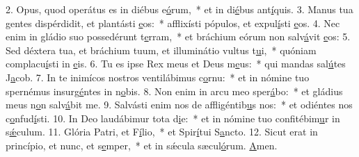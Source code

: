 2. Opus, quod operátus es in diébus e\uline{ó}rum,~* et in di\uline{é}bus ant\uline{í}quis.
3. Manus tua gentes dispérdidit, et plantásti \uline{e}os:~* afflixísti pópulos, et expul\uline{í}sti \uline{e}os.
4. Nec enim in gládio suo possedérunt t\uline{e}rram,~* et bráchium eórum non salv\uline{á}vit \uline{e}os:
5. Sed déxtera tua, et bráchium tuum, et illuminátio vultus t\uline{u}i,~* quóniam complacu\uline{í}sti in \uline{e}is.
6. Tu es ipse Rex meus et Deus m\uline{e}us:~* qui mandas sal\uline{ú}tes J\uline{a}cob.
7. In te inimícos nostros ventilábimus c\uline{o}rnu:~* et in nómine tuo spernémus insurg\uline{é}ntes in n\uline{o}bis.
8. Non enim in arcu meo sper\uline{á}bo:~* et gládius meus n\uline{o}n salv\uline{á}bit me.
9. Salvásti enim nos de affligéntib\uline{u}s nos:~* et odiéntes nos c\uline{o}nfud\uline{í}sti.
10. In Deo laudábimur tota d\uline{i}e:~* et in nómine tuo confitébim\uline{u}r in s\uline{ǽ}culum.
11. Glória Patri, et F\uline{í}lio,~* et Spir\uline{í}tui S\uline{a}ncto.
12. Sicut erat in princípio, et nunc, et s\uline{e}mper,~* et in sǽcula sæcul\uline{ó}rum. \uline{A}men.
